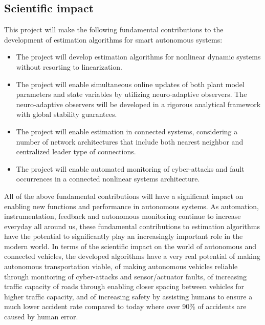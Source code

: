 \documentclass[a4paper,11pt]{article}
\begin{document}
\subsection[Scientific impact]{Scientific impact}
%
This project will make the following fundamental contributions to the development of estimation algorithms for smart autonomous systems:
\vspace{-0.3cm}
\begin{itemize}
\item The project will develop estimation algorithms for nonlinear dynamic systems without resorting to linearization.
\vspace{-0.3cm}
\item The project will enable simultaneous online updates of both plant model parameters and state variables by utilizing neuro-adaptive observers.  The neuro-adaptive observers will be developed in a rigorous analytical framework with global stability guarantees.
\vspace{-0.3cm}
\item The project will enable estimation in connected systems, considering a number of network architectures that include both nearest neighbor and centralized leader type of connections. 
\vspace{-0.3cm}
\item The project will enable automated monitoring of cyber-attacks and fault occurrences in a connected nonlinear systems architecture.
\end{itemize}
All of the above fundamental contributions will have a significant impact on enabling new functions and performance in autonomous systems.  As automation, instrumentation, feedback and autonomous monitoring continue to increase everyday all around us, these fundamental contributions to estimation algorithms have the potential to significantly play an increasingly important role in the modern world.
In terms of the scientific impact on the world of autonomous and connected vehicles, the developed algorithms have a very real potential of making autonomous transportation viable, of making autonomous vehicles reliable through monitoring of cyber-attacks and sensor/actuator faults, of increasing traffic capacity of roads through enabling closer spacing between vehicles for higher traffic capacity, and of increasing safety by assisting humans to ensure a much lower accident rate compared to today where over 90\% of accidents are caused by human error.
\end{document}
